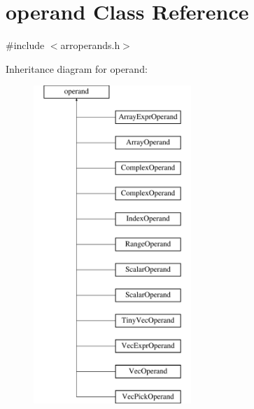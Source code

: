 \hypertarget{classoperand}{}\section{operand Class Reference}
\label{classoperand}


{\ttfamily \#include $<$arroperands.\+h$>$}

Inheritance diagram for operand\+:\begin{figure}[H]
\begin{center}
\leavevmode
\includegraphics[height=12.000000cm]{classoperand}
\end{center}
\end{figure}
